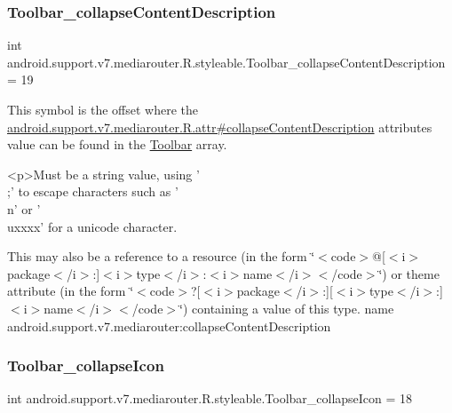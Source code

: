 \subsubsection{\texorpdfstring{Toolbar\+\_\+collapse\+Content\+Description}{Toolbar\_collapseContentDescription}}
{\footnotesize\ttfamily int android.\+support.\+v7.\+mediarouter.\+R.\+styleable.\+Toolbar\+\_\+collapse\+Content\+Description = 19\hspace{0.3cm}{\ttfamily [static]}}

This symbol is the offset where the \hyperlink{classandroid_1_1support_1_1v7_1_1mediarouter_1_1R_1_1attr_a19e837e1a95143b4a69da4c398cb0dfe}{android.\+support.\+v7.\+mediarouter.\+R.\+attr\#collapse\+Content\+Description} attribute\textquotesingle{}s value can be found in the \hyperlink{classandroid_1_1support_1_1v7_1_1mediarouter_1_1R_1_1styleable_a6815cdfaadde30c82b955863af196899}{Toolbar} array.

\begin{DoxyVerb}      <p>Must be a string value, using '\\;' to escape characters such as '\\n' or '\\uxxxx' for a unicode character.
\end{DoxyVerb}
 

This may also be a reference to a resource (in the form \char`\"{}$<$code$>$@\mbox{[}$<$i$>$package$<$/i$>$\+:\mbox{]}$<$i$>$type$<$/i$>$\+:$<$i$>$name$<$/i$>$$<$/code$>$\char`\"{}) or theme attribute (in the form \char`\"{}$<$code$>$?\mbox{[}$<$i$>$package$<$/i$>$\+:\mbox{]}\mbox{[}$<$i$>$type$<$/i$>$\+:\mbox{]}$<$i$>$name$<$/i$>$$<$/code$>$\char`\"{}) containing a value of this type.  name android.\+support.\+v7.\+mediarouter\+:collapse\+Content\+Description \mbox{\label{classandroid_1_1support_1_1v7_1_1mediarouter_1_1R_1_1styleable_a93c3561c7efd4ac1f04f5d87f57da44e}} 
\subsubsection{\texorpdfstring{Toolbar\+\_\+collapse\+Icon}{Toolbar\_collapseIcon}}
{\footnotesize\ttfamily int android.\+support.\+v7.\+mediarouter.\+R.\+styleable.\+Toolbar\+\_\+collapse\+Icon = 18\hspace{0.3cm}{\ttfamily [static]}}

